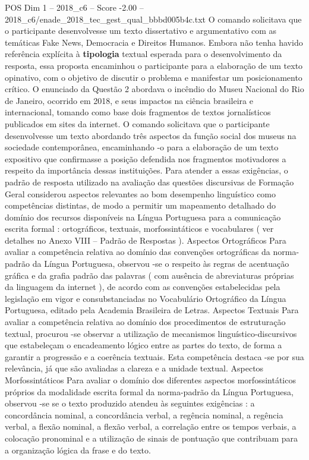 \begin{textsample}{POS Dim 1 – 2018\_c6 – Score -2.00 – 2018\_c6/enade\_2018\_tec\_gest\_qual\_bbbd005b4c.txt}
O comando solicitava que o participante desenvolvesse um texto dissertativo e argumentativo com as temáticas Fake News, Democracia e Direitos Humanos.
Embora não tenha havido referência explícita à \textbf{tipologia} textual esperada para o desenvolvimento da resposta, essa proposta encaminhou o participante para a elaboração de um texto opinativo, com o objetivo de discutir o problema e manifestar um posicionamento crítico.
O enunciado da Questão 2 abordava o incêndio do Museu Nacional do Rio de Janeiro, ocorrido em 2018, e seus impactos na ciência brasileira e internacional, tomando como base dois fragmentos de textos jornalísticos publicados em sites da internet.
O comando solicitava que o participante desenvolvesse um texto abordando três aspectos da função social dos museus na sociedade contemporânea, encaminhando -o para a elaboração de um texto expositivo que confirmasse a posição defendida nos fragmentos motivadores a respeito da importância dessas instituições.
Para atender a essas exigências, o padrão de resposta utilizado na avaliação das questões discursivas de Formação Geral considerou aspectos relevantes ao bom desempenho linguístico como competências distintas, de modo a permitir um mapeamento detalhado do domínio dos recursos disponíveis na Língua Portuguesa para a comunicação escrita formal : ortográficos, textuais, morfossintáticos e vocabulares ( ver detalhes no Anexo VIII – Padrão de Respostas ).
Aspectos Ortográficos Para avaliar a competência relativa ao domínio das convenções ortográficas da norma-padrão da Língua Portuguesa, observou -se o respeito às regras de acentuação gráfica e da grafia padrão das palavras ( com ausência de abreviaturas próprias da linguagem da internet ), de acordo com as convenções estabelecidas pela legislação em vigor e consubstanciadas no Vocabulário Ortográfico da Língua Portuguesa, editado pela Academia Brasileira de Letras.
Aspectos Textuais Para avaliar a competência relativa ao domínio dos procedimentos de estruturação textual, procurou -se observar a utilização de mecanismos linguístico-discursivos que estabeleçam o encadeamento lógico entre as partes do texto, de forma a garantir a progressão e a coerência textuais.
Esta competência destaca -se por sua relevância, já que são avaliadas a clareza e a unidade textual.
Aspectos Morfossintáticos Para avaliar o domínio dos diferentes aspectos morfossintáticos próprios da modalidade escrita formal da norma-padrão da Língua Portuguesa, observou -se se o texto produzido atendeu às seguintes exigências : a concordância nominal, a concordância verbal, a regência nominal, a regência verbal, a flexão nominal, a flexão verbal, a correlação entre os tempos verbais, a colocação pronominal e a utilização de sinais de pontuação que contribuam para a organização lógica da frase e do texto.

\end{textsample}
